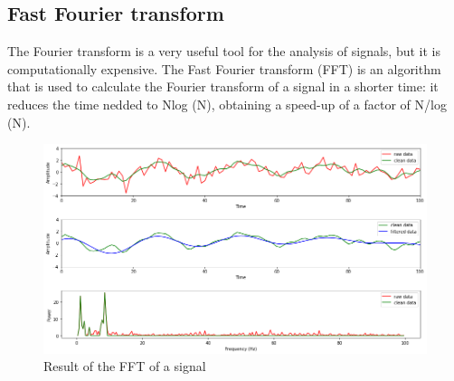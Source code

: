\documentclass[a4paper, noexaminfo]{sapthesis}
\begin{document}
\subsection{Fast Fourier transform}\label{sec:fft}
The Fourier transform is a very useful tool for the analysis of signals,
but it is computationally expensive. The Fast Fourier transform (FFT)\cite{fft} is
an algorithm that is used to calculate the Fourier transform
of a signal in a shorter time: it reduces the time nedded to Nlog (N),
 obtaining a speed-up of a factor of N/log (N).\newline
\begin{figure}[h!]
  \includegraphics[scale=0.45]{fft_waves_result}
  \centering
  \caption{Result of the FFT of a signal
  }\label{fig:fft}
  
  \end{figure}
\end{document}
